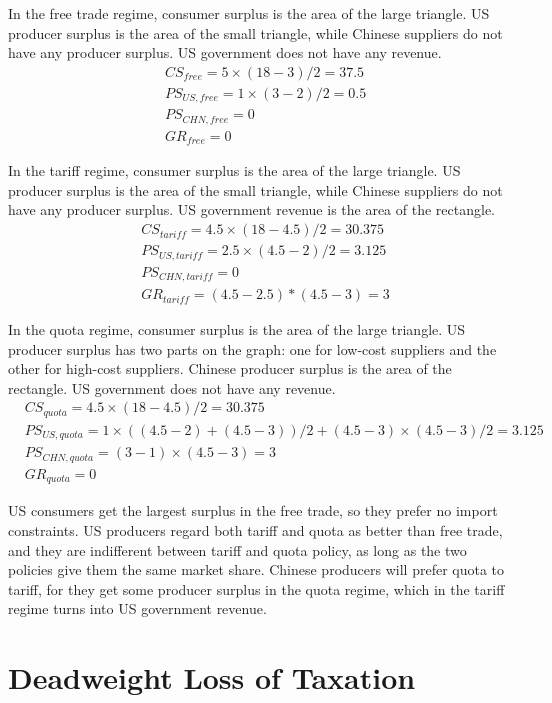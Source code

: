 \documentclass{article}
\begin{document}
In the free trade regime, consumer surplus is the area of the large triangle. US producer surplus is the area of the small triangle, while Chinese suppliers do not have any producer surplus. US government does not have any revenue.
\begin{align*}
&CS_{free}=5\times(18-3)/2=37.5\\
&PS_{US,free}=1\times(3-2)/2=0.5\\
&PS_{CHN,free}=0\\
&GR_{free}=0
\end{align*}

In the tariff regime, consumer surplus is the area of the large triangle. US producer surplus is the area of the small triangle, while Chinese suppliers do not have any producer surplus. US government revenue is the area of the rectangle.
\begin{align*}
&CS_{tariff}=4.5\times(18-4.5)/2=30.375\\
&PS_{US,tariff}=2.5\times(4.5-2)/2=3.125\\
&PS_{CHN,tariff}=0\\
&GR_{tariff}=(4.5-2.5)*(4.5-3)=3
\end{align*}


In the quota regime, consumer surplus is the area of the large triangle. US producer surplus has two parts on the graph: one for low-cost suppliers and the other for high-cost suppliers. Chinese producer surplus is the area of the rectangle. US government does not have any revenue.
\begin{align*}
&CS_{quota}=4.5\times(18-4.5)/2=30.375\\
&PS_{US,quota}=1\times((4.5-2)+(4.5-3))/2+(4.5-3)\times(4.5-3)/2=3.125\\
&PS_{CHN,quota}=(3-1)\times(4.5-3)=3\\
&GR_{quota}=0
\end{align*}

US consumers get the largest surplus in the free trade, so they prefer no import constraints. US producers regard both tariff and quota as better than free trade, and they are indifferent between tariff and quota policy, as long as the two policies give them the same market share. Chinese producers will prefer quota to tariff, for they get some producer surplus in the quota regime, which in the tariff regime turns into US government revenue.

\section{Deadweight Loss of Taxation}
\end{document}
